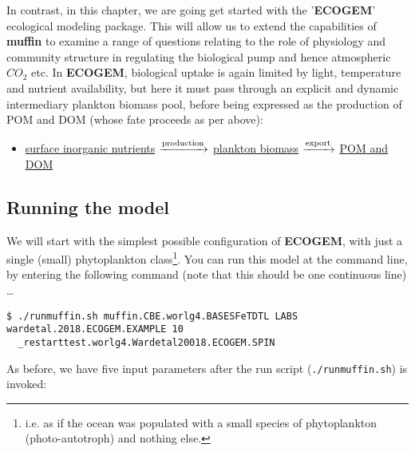 \documentclass[11pt,fleqn]{book} %
\begin{document}
In contrast, in this chapter, we are going get started with the '\textbf{ECOGEM}' ecological modeling package. This will allow us to extend the capabilities of \textbf{muffin} to examine a range of questions relating to the role of physiology and community structure in regulating the biological pump and hence atmospheric \(CO_{2}\) etc. In \textbf{ECOGEM}, biological uptake is again limited by light, temperature and nutrient availability, but here it must pass through an explicit and dynamic intermediary plankton biomass pool, before being expressed as the production of POM and DOM (whose fate proceeds as per above):
\vspace{4mm}
\begin{itemize}
\item \underline{surface inorganic nutrients} $\xrightarrow[]{\rm production}$ \underline{plankton biomass} $\xrightarrow[]{\rm export}$ \underline{POM and DOM}
\end{itemize}
\vspace{4mm}


\subsection{Running the model}

We will start with the simplest possible configuration of \textbf{ECOGEM}, with just a single (small) phytoplankton class\footnote{i.e. as if the ocean was populated with a small species of phytoplankton (photo-autotroph) and nothing else.}. You can run this model at the command line, by entering the following command (note that this should be one continuous line) \dots
\small\begin{verbatim}
$ ./runmuffin.sh muffin.CBE.worlg4.BASESFeTDTL LABS wardetal.2018.ECOGEM.EXAMPLE 10
  _restarttest.worlg4.Wardetal20018.ECOGEM.SPIN
\end{verbatim}\normalsize

\noindent As before, we have five input parameters after  the run script (\texttt{./runmuffin.sh}) is invoked:
\end{document}
